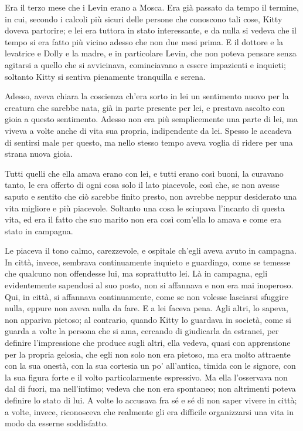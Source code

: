 \label{parte-settima} 
\pagestyle{pagina}

\label{i-6} 

Era il terzo mese che i Levin erano a Mosca. Era già passato da tempo il termine, in cui, secondo i calcoli più sicuri delle persone che conoscono tali cose, Kitty doveva partorire; e lei era tuttora in stato interessante, e da nulla si vedeva che il tempo si era fatto più vicino adesso che non due mesi prima. E il dottore e la levatrice e Dolly e la madre, e in particolare Levin, che non poteva pensare senza agitarsi a quello che si avvicinava, cominciavano a essere impazienti e inquieti; soltanto Kitty si sentiva pienamente tranquilla e serena. 

Adesso, aveva chiara la coscienza ch'era sorto in lei un sentimento nuovo per la creatura che sarebbe nata, già in parte presente per lei, e prestava ascolto con gioia a questo sentimento. Adesso non era più semplicemente una parte di lei, ma viveva a volte anche di vita sua propria, indipendente da lei. Spesso le accadeva di sentirsi male per questo, ma nello stesso tempo aveva voglia di ridere per una strana nuova gioia. 

Tutti quelli che ella amava erano con lei, e tutti erano così buoni, la curavano tanto, le era offerto di ogni cosa solo il lato piacevole, così che, se non avesse saputo e sentito che ciò sarebbe finito presto, non avrebbe neppur desiderato una vita migliore e più piacevole. Soltanto una cosa le sciupava l'incanto di questa vita, ed era il fatto che suo marito non era così com'ella lo amava e come era stato in campagna. 

Le piaceva il tono calmo, carezzevole, e ospitale ch'egli aveva avuto in campagna. In città, invece, sembrava continuamente inquieto e guardingo, come se temesse che qualcuno non offendesse lui, ma soprattutto lei. Là in campagna, egli evidentemente sapendosi al suo posto, non si affannava e non era mai inoperoso. Qui, in città, si affannava continuamente, come se non volesse lasciarsi sfuggire nulla, eppure non aveva nulla da fare. E a lei faceva pena. Agli altri, lo sapeva, non appariva pietoso; al contrario, quando Kitty lo guardava in società, come si guarda a volte la persona che si ama, cercando di giudicarla da estranei, per definire l'impressione che produce sugli altri, ella vedeva, quasi con apprensione per la propria gelosia, che egli non solo non era pietoso, ma era molto attraente con la sua onestà, con la sua cortesia un po' all'antica, timida con le signore, con la sua figura forte e il volto particolarmente espressivo. Ma ella l'osservava non dal di fuori, ma nell'intimo; vedeva che non era spontaneo; non altrimenti poteva definire lo stato di lui. A volte lo accusava fra sé e sé di non saper vivere in città; a volte, invece, riconosceva che realmente gli era difficile organizzarsi una vita in modo da esserne soddisfatto. 

